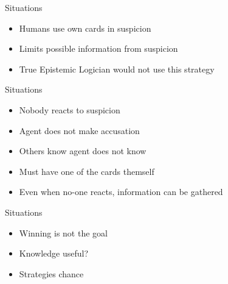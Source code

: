 \begin{frame}{Situations}
    \begin{itemize}
        \item Humans use own cards  in suspicion
        \item Limits possible information from suspicion
        \item True Epistemic Logician would not use this strategy
    \end{itemize}
\end{frame}

\begin{frame}{Situations}
    \begin{itemize}
        \item Nobody reacts to suspicion
        \item Agent does not make accusation
            \pause
        \item Others know agent does not know
        \item Must have one of the cards themself
        \item Even when no-one reacts, information can be gathered
    \end{itemize}
\end{frame}

\begin{frame}{Situations}
    \begin{itemize}
        \item Winning is not the goal
        \item Knowledge useful?
            \pause
        \item Strategies chance
    \end{itemize}
\end{frame}
